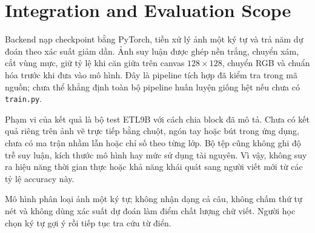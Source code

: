 \section{Integration and Evaluation Scope}

Backend nạp checkpoint bằng PyTorch, tiền xử lý ảnh một ký tự và trả năm dự đoán theo xác suất giảm dần. Ảnh suy luận được ghép nền trắng, chuyển xám, cắt vùng mực, giữ tỷ lệ khi căn giữa trên canvas $128\times128$, chuyển RGB và chuẩn hóa trước khi đưa vào mô hình. Đây là pipeline tích hợp đã kiểm tra trong mã nguồn; chưa thể khẳng định toàn bộ pipeline huấn luyện giống hệt nếu chưa có \texttt{train.py}.

Phạm vi của kết quả là bộ test ETL9B với cách chia block đã mô tả. Chưa có kết quả riêng trên ảnh vẽ trực tiếp bằng chuột, ngón tay hoặc bút trong ứng dụng, chưa có ma trận nhầm lẫn hoặc chỉ số theo từng lớp. Bộ tệp cũng không ghi độ trễ suy luận, kích thước mô hình hay mức sử dụng tài nguyên. Vì vậy, không suy ra hiệu năng thời gian thực hoặc khả năng khái quát sang người viết mới từ các tỷ lệ accuracy này.

Mô hình phân loại ảnh một ký tự; không nhận dạng cả câu, không chấm thứ tự nét và không dùng xác suất dự đoán làm điểm chất lượng chữ viết. Người học chọn ký tự gợi ý rồi tiếp tục tra cứu từ điển.

